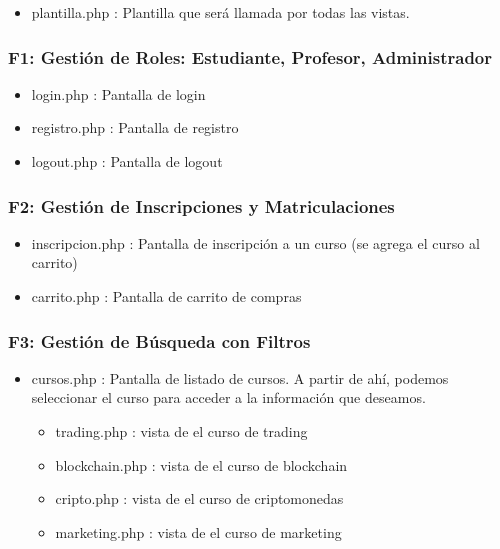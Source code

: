\documentclass[
]{article}
\providecommand{\tightlist}{%
  \setlength{\itemsep}{0pt}\setlength{\parskip}{0pt}}
\begin{document}
\begin{itemize}
\tightlist
\item
  plantilla.php : Plantilla que será llamada por todas las vistas.
\end{itemize}

\subsubsection{F1: Gestión de Roles: Estudiante, Profesor,
Administrador}\label{f1-gestiuxf3n-de-roles-estudiante-profesor-administrador}

\begin{itemize}
\item
  login.php : Pantalla de login
\item
  registro.php : Pantalla de registro
\item
  logout.php : Pantalla de logout
\end{itemize}

\subsubsection{F2: Gestión de Inscripciones y
Matriculaciones}\label{f2-gestiuxf3n-de-inscripciones-y-matriculaciones}

\begin{itemize}
\item
  inscripcion.php : Pantalla de inscripción a un curso (se agrega el
  curso al carrito)
\item
  carrito.php : Pantalla de carrito de compras
\end{itemize}

\subsubsection{F3: Gestión de Búsqueda con
Filtros}\label{f3-gestiuxf3n-de-buxfasqueda-con-filtros}

\begin{itemize}
\item
  cursos.php : Pantalla de listado de cursos. A partir de ahí, podemos
  seleccionar el curso para acceder a la información que deseamos.

  \begin{itemize}
  \item
    trading.php : vista de el curso de trading
  \item
    blockchain.php : vista de el curso de blockchain
  \item
    cripto.php : vista de el curso de criptomonedas
  \item
    marketing.php : vista de el curso de marketing
  \end{itemize}
\end{itemize}
\end{document}
